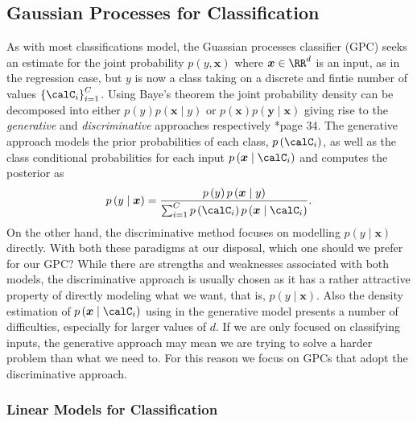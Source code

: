 \subsection{Gaussian Processes for Classification}\label{Section1.6}

As with most classifications model, the Guassian processes classifier (GPC) seeks an estimate for the joint probability $p \left( y , \bm{x} \right)$ where $\bm{x} \in \RR^d$ is an input, as in the regression case, but $y$ is now a class taking on a discrete and fintie number of values $\left\{ \calC_i \right\}_{i=1}^C$. Using Baye's theorem the joint probability density can be decomposed into either $p \left( y \right) p \left( \bm{x} \mid y \right)$ or $p \left( \bm{x} \right) p \left( \bm{y} \mid \bm{x} \right)$ giving rise to the {\it generative} and {\it discriminative} approaches respectively \cite{RasmussenCarlEdward2006Gpfm}*{page 34}. The generative approach models the prior probabilities of each class, $p \left( \calC_i \right)$, as well as the class conditional probabilities for each input $p \left( \bm{x} \mid \calC_i \right)$ and computes the posterior as
\[
    p \left( y \mid \bm{x} \right) = \frac{ p \left( y \right) p \left( \bm{x} \mid y \right) }{ \sum_{i=1}^{C} p \left( \calC_i \right) p \left( \bm{x} \mid \calC_i \right) }.
\]
On the other hand, the discriminative method focuses on modelling $p \left( y \mid \bm{x} \right)$ directly. With both these paradigms at our disposal, which one should we prefer for our GPC? While there are strengths and weaknesses associated with both models, the discriminative approach is usually chosen as it has a rather attractive property of directly modeling what we want, that is, $p \left( y \mid \bm{x} \right)$. Also the density estimation of $p \left( \bm{x} \mid \calC_i \right)$ using in the generative model presents a number of difficulties, especially for larger values of $d$. If we are only focused on classifying inputs, the generative approach may mean we are trying to solve a harder problem than what we need to. For this reason we focus on GPCs that adopt the discriminative approach.

\subsubsection{Linear Models for Classification}\label{Section1.6.1}

